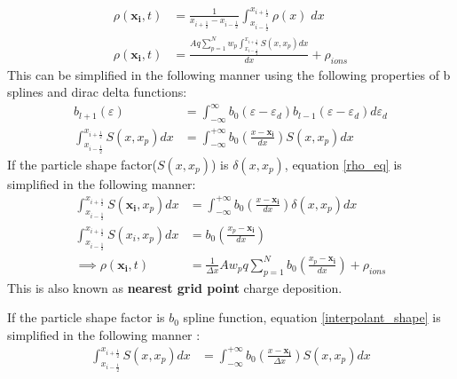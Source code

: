 \documentclass{article}
\begin{document}
\begin{align}
\rho(\mathbf{x_{i}}, t) &= \frac{1}{x_{i + \frac{1}{2}} - x_{i - \frac{1}{2}}}\int_{x_{i - \frac{1}{2}}}^{x_{i + \frac{1}{2}}} \rho (x) \;dx \\
\rho(\mathbf{x_{i}}, t) &= \frac{Aq \sum_{p = 1}^{N}w_{p}\int_{x_{i - \frac{1}{2}}}^{x_{i + \frac{1}{2}}} S(x, x_{p})dx }{dx} + \rho_{ions}\label{rho_eq}
\end{align}
This can be simplified in the following manner using the following properties of b splines and dirac delta functions:
\begin{align}
b_{l+1}(\varepsilon) &= \int_{-\infty}^{\infty} b_{0}(\varepsilon - \varepsilon_{d})b_{l-1}(\varepsilon - \varepsilon_{d})d\varepsilon_{d}   \label{b_spline_prop} \\
\int_{x_{i - \frac{1}{2}}}^{x_{i + \frac{1}{2}}} S(x, x_{p})dx &= \int_{-\infty}^{+\infty}b_{0}\left(\frac{x - \mathbf{x_{i}}}{dx}\right) S(x, x_{p})dx \label{interpolant_shape}
\end{align}
If the particle shape factor($S(x,x_{p})$) is $\delta(x,x_{p})$, equation \ref{rho_eq} is simplified in the following manner:
\begin{align}
\int_{x_{i - \frac{1}{2}}}^{x_{i + \frac{1}{2}}} S(\mathbf{x_{i}}, x_{p})dx &= \int_{-\infty}^{+\infty}b_{0}\left(\frac{x - \mathbf{x_{i}}}{dx}\right) \delta(x, x_{p})dx \\
\int_{x_{i - \frac{1}{2}}}^{x_{i + \frac{1}{2}}} S(x_{i}, x_{p})dx &= b_{0}\left(\frac{x_{p} - \mathbf{x_{i}}}{dx}\right) \\
\implies \rho(\mathbf{x_{i}}, t) &= \frac{1}{\Delta x}Aw_{p}q \sum_{p = 1}^{N} b_{0}\left(\frac{x_{p} - \mathbf{x_{i}}}{dx}\right)  + \rho_{ions}
\end{align}
This is also known as \textbf{nearest grid point} charge deposition. 

If the particle shape factor is $b_{0}$ spline function, equation \ref{interpolant_shape} is simplified in the following manner :
\begin{align}
\int_{x_{i - \frac{1}{2}}}^{x_{i + \frac{1}{2}}} S(x, x_{p})dx &= \int_{-\infty}^{+\infty}b_{0}\left(\frac{x - \mathbf{x_{i}}}{\Delta x}\right) S(x, x_{p})dx
\end{align}
\end{document}
